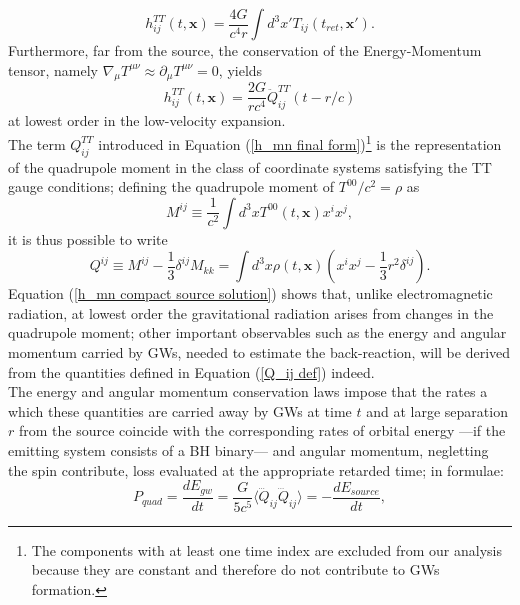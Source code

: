 \documentclass[12pt,twoside,openany]{book}
\begin{document}
\begin{equation}\label{h_mn compact source solution}
    h_{ij}^{TT}(t,\mathbf{x})=\frac{4G}{c^4r}\int d^3x'T_{ij}(t_{ret},\mathbf{x'}).
\end{equation}
Furthermore, far from the source, the conservation of the Energy-Momentum tensor, namely $\nabla_\mu T^{\mu\nu}\approx\partial_\mu T^{\mu\nu}=0$, yields
\begin{equation}\label{h_mn final form}
    h_{ij}^{TT}(t,\boldsymbol{x})=\frac{2G}{rc^4}\ddot{Q}^{TT}_{ij}(t-r/c)
\end{equation}
at lowest order in the low-velocity expansion.\\The term $Q^{TT}_{ij}$ introduced in Equation (\ref{h_mn final form})\footnote{The components with at least one time index are excluded from our analysis because they are constant and therefore do not contribute to GWs formation.} is the representation of the quadrupole moment in the class of coordinate systems satisfying the TT gauge conditions; defining the quadrupole moment of $T^{00}/c^2=\rho$ as
\begin{equation}\label{M_ij definition}
    M^{ij}\equiv \frac{1}{c^2}\int d^3x T^{00}(t,\boldsymbol{x})x^ix^j,
\end{equation}
it is thus possible to write
\begin{equation}\label{Q_ij def}
    Q^{ij}\equiv M^{ij}-\frac{1}{3}\delta^{ij}M_{kk}=\int d^3x\rho(t,\mathbf{x})\left(x^ix^j-\frac{1}{3}r^2\delta^{ij}\right).
\end{equation}
Equation (\ref{h_mn compact source solution}) shows that, unlike electromagnetic radiation, at lowest order the gravitational radiation arises from changes in the quadrupole moment; other important observables such as the energy and angular momentum carried by GWs, needed to estimate the back-reaction, will be derived from the quantities defined in Equation (\ref{Q_ij def}) indeed.\\The energy and angular momentum conservation laws impose that the rates a which these quantities are carried away by GWs at time $t$ and at large separation $r$ from the source coincide with the corresponding rates of orbital energy ---if the emitting system consists of a BH binary--- and angular momentum, negletting the spin contribute, loss evaluated at the appropriate retarded time; in formulae:
\begin{equation}\label{energy loss rate by GWs}
    P_{quad}=\frac{dE_{gw}}{dt}=\frac{G}{5c^5}\langle\dddot{Q}_{ij}\dddot{Q}_{ij}\rangle=-\frac{dE_{source}}{dt},
\end{equation}
\end{document}
